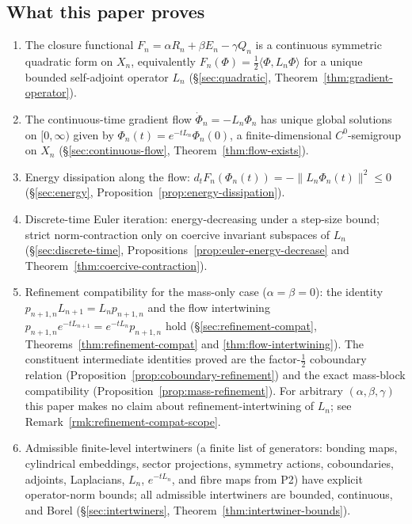 \documentclass[11pt, a4paper]{amsart}
\theoremstyle{definition}
\begin{document}
\subsection{What this paper proves}

\begin{enumerate}
\item The closure functional $F_n = \alpha R_n + \beta E_n -
  \gamma Q_n$ is a continuous symmetric quadratic form on $X_n$,
  equivalently $F_n(\Phi) = \tfrac{1}{2}\langle \Phi, L_n \Phi
  \rangle$ for a unique bounded self-adjoint operator $L_n$
  (\S\ref{sec:quadratic}, Theorem~\ref{thm:gradient-operator}).
\item The continuous-time gradient flow $\dot\Phi_n = -L_n \Phi_n$
  has unique global solutions on $[0, \infty)$ given by
  $\Phi_n(t) = e^{-t L_n} \Phi_n(0)$, a finite-dimensional
  $C^0$-semigroup on $X_n$
  (\S\ref{sec:continuous-flow}, Theorem~\ref{thm:flow-exists}).
\item Energy dissipation along the flow:
  $d_t F_n(\Phi_n(t)) = -\|L_n \Phi_n(t)\|^2 \leq 0$
  (\S\ref{sec:energy}, Proposition~\ref{prop:energy-dissipation}).
\item Discrete-time Euler iteration: energy-decreasing under a
  step-size bound; strict norm-contraction only on coercive
  invariant subspaces of $L_n$
  (\S\ref{sec:discrete-time}, Propositions~\ref{prop:euler-energy-decrease}
  and Theorem~\ref{thm:coercive-contraction}).
\item Refinement compatibility for the mass-only case
  ($\alpha = \beta = 0$): the identity $p_{n+1, n} L_{n+1} =
  L_n p_{n+1, n}$ and the flow intertwining
  $p_{n+1, n} e^{-t L_{n+1}} = e^{-t L_n} p_{n+1, n}$ hold
  (\S\ref{sec:refinement-compat},
  Theorems~\ref{thm:refinement-compat} and
  \ref{thm:flow-intertwining}). The constituent intermediate
  identities proved are the factor-$\tfrac{1}{2}$ coboundary
  relation (Proposition~\ref{prop:coboundary-refinement}) and the
  exact mass-block compatibility
  (Proposition~\ref{prop:mass-refinement}). For arbitrary
  $(\alpha, \beta, \gamma)$ this paper makes no claim about
  refinement-intertwining of $L_n$; see
  Remark~\ref{rmk:refinement-compat-scope}.
\item Admissible finite-level intertwiners (a finite list of
  generators: bonding maps, cylindrical embeddings, sector
  projections, symmetry actions, coboundaries, adjoints,
  Laplacians, $L_n$, $e^{-tL_n}$, and fibre maps from P2) have
  explicit operator-norm bounds; all admissible intertwiners are
  bounded, continuous, and Borel
  (\S\ref{sec:intertwiners}, Theorem~\ref{thm:intertwiner-bounds}).
\end{enumerate}
\end{document}
